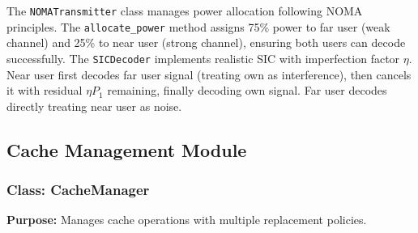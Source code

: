 \documentclass[12pt,a4paper]{article}
\begin{document}
The \texttt{NOMATransmitter} class manages power allocation following NOMA principles. The \texttt{allocate\_power} method assigns 75\% power to far user (weak channel) and 25\% to near user (strong channel), ensuring both users can decode successfully. The \texttt{SICDecoder} implements realistic SIC with imperfection factor $\eta$. Near user first decodes far user signal (treating own as interference), then cancels it with residual $\eta P_1$ remaining, finally decoding own signal. Far user decodes directly treating near user as noise.

\subsection{Cache Management Module}

\subsubsection{Class: CacheManager}

\textbf{Purpose:} Manages cache operations with multiple replacement policies.
\end{document}
